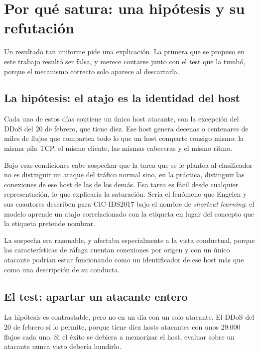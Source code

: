 \section{Por qué satura: una hipótesis y su refutación}
\label{sec:por-que-satura}

Un resultado tan uniforme pide una explicación. La primera que se propuso en
este trabajo resultó ser falsa, y merece contarse junto con el test que la
tumbó, porque el mecanismo correcto solo aparece al descartarla.

\subsection*{La hipótesis: el atajo es la identidad del host}

Cada uno de estos días contiene un único host atacante, con la excepción del
DDoS del 20 de febrero, que tiene diez. Ese host genera decenas o centenares de
miles de flujos que comparten todo lo que un host comparte consigo mismo: la
misma pila TCP, el mismo cliente, las mismas cabeceras y el mismo ritmo.

Bajo esas condiciones cabe sospechar que la tarea que se le plantea al
clasificador no es distinguir un ataque del tráfico normal sino, en la práctica,
distinguir las conexiones de ese host de las de los demás. Esa tarea es fácil
desde cualquier representación, lo que explicaría la saturación. Sería el
fenómeno que Engelen y sus coautores describen para CIC-IDS2017
\cite{Engelen2021} bajo el nombre de \emph{shortcut learning}: el modelo aprende
un atajo correlacionado con la etiqueta en lugar del concepto que la etiqueta
pretende nombrar.

La sospecha era razonable, y afectaba especialmente a la vista conductual,
porque las características de ráfaga cuentan conexiones por origen y con un
único atacante podrían estar funcionando como un identificador de ese host más
que como una descripción de su conducta.

\subsection*{El test: apartar un atacante entero}

La hipótesis es contrastable, pero no en un día con un solo atacante. El DDoS
del 20 de febrero sí lo permite, porque tiene diez hosts atacantes con unos
29.000 flujos cada uno. Si el éxito se debiera a memorizar el host, evaluar
sobre un atacante nunca visto debería hundirlo.

